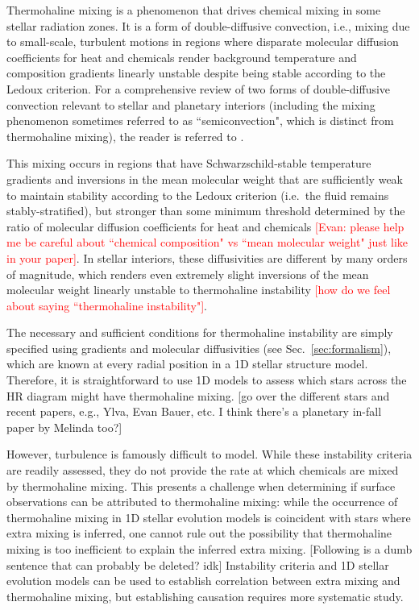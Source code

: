 Thermohaline mixing is a phenomenon that drives chemical mixing in some stellar radiation zones. 
It is a form of double-diffusive convection, i.e., mixing due to small-scale, turbulent motions in regions where disparate molecular diffusion coefficients for heat and chemicals render background temperature and composition gradients linearly unstable despite being stable according to the Ledoux criterion. 
For a comprehensive review of two forms of double-diffusive convection relevant to stellar and planetary interiors (including the mixing phenomenon sometimes referred to as ``semiconvection", which is distinct from thermohaline mixing), the reader is referred to \citet{garaud_DDC_review_2018}. 

This mixing occurs in regions that have Schwarzschild-stable temperature gradients and inversions in the mean molecular weight that are sufficiently weak to maintain stability according to the Ledoux criterion (i.e.~the fluid remains stably-stratified), but stronger than some minimum threshold determined by the ratio of molecular diffusion coefficients for heat and chemicals \textcolor{red}{[Evan: please help me be careful about ``chemical composition" vs ``mean molecular weight" just like in your paper]}. 
In stellar interiors, these diffusivities are different by many orders of magnitude, which renders even extremely slight inversions of the mean molecular weight linearly unstable to thermohaline instability \textcolor{red}{[how do we feel about saying ``thermohaline instability"]}.

The necessary and sufficient conditions for thermohaline instability are simply specified using gradients and molecular diffusivities (see Sec.~\ref{sec:formalism}), which are known at every radial position in a 1D stellar structure model. 
Therefore, it is straightforward to use 1D models to assess which stars across the HR diagram might have thermohaline mixing. [go over the different stars and recent papers, e.g., Ylva, Evan Bauer, etc. I think there's a planetary in-fall paper by Melinda too?]

However, turbulence is famously difficult to model. 
While these instability criteria are readily assessed, they do not provide the rate at which chemicals are mixed by thermohaline mixing. 
This presents a challenge when determining if surface observations can be attributed to thermohaline mixing: while the occurrence of thermohaline mixing in 1D stellar evolution models is coincident with stars where extra mixing is inferred, one cannot rule out the possibility that thermohaline mixing is too inefficient to explain the inferred extra mixing. 
[Following is a dumb sentence that can probably be deleted? idk] Instability criteria and 1D stellar evolution models can be used to establish correlation between extra mixing and thermohaline mixing, but establishing causation requires more systematic study.

